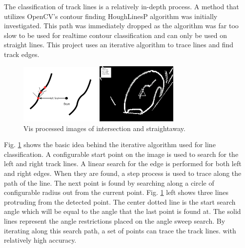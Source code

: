\documentclass{article}
\begin{document}
The classification of track lines is a relatively in-depth process. A method that utilizes OpenCV's contour finding HoughLinesP algorithm was initially investigated. This path was immediately dropped as the algorithm was far too slow to be used for realtime contour classification and can only be used on straight lines. This project uses an iterative algorithm to trace lines and find track edges.

\begin{figure}[htb]
	\begin{minipage}[b]{.48\linewidth}
		\centering
		\centerline{\includegraphics[width=4.0cm]{track}}
	\end{minipage}
	\hfill
	\begin{minipage}[b]{0.48\linewidth}
		\centering
		\centerline{\includegraphics[width=4.0cm]{vis_figs/nav_turn}}
	\end{minipage}
	\caption{Vis processed images of intersection and straightaway.}
	\label{fig:track_find}
\end{figure}

Fig. \ref{fig:track_find} shows the basic idea behind the iterative algorithm used for line classification. A configurable start point on the image is used to search for the left and right track lines. A linear search for the edge is performed for both left and right edges. When they are found, a step process is used to trace along the path of the line. The next point is found by searching along a circle of configurable radius out from the current point. Fig. \ref{fig:track_find} left shows three lines protruding from the detected point. The center dotted line is the start search angle which will be equal to the angle that the last point is found at. The solid lines represent the angle restrictions placed on the angle sweep search. By iterating along this search path, a set of points can trace the track lines. with relatively high accuracy.
\end{document}
